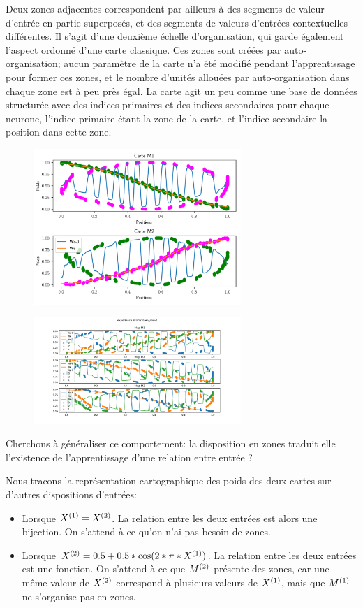 Deux zones adjacentes correspondent par ailleurs à des segments de valeur d'entrée en partie superposés, et des segments de valeurs d'entrées contextuelles différentes. Il s'agit d'une deuxième échelle d'organisation, qui garde également l'aspect ordonné d'une carte classique. Ces zones sont créées par auto-organisation; aucun paramètre de la carte n'a été modifié pendant l'apprentissage pour former ces zones, et le nombre d'unités allouées par auto-organisation dans chaque zone est à peu près égal. La carte agit un peu comme une base de données structurée avec des indices primaires et des indices secondaires pour chaque neurone, l'indice primaire étant la zone de la carte, et l'indice secondaire la position dans cette zone.

\begin{figure}
	\includegraphics[width=0.7\textwidth]{2som_cercle_w.pdf}
\end{figure}

\begin{figure}
	\includegraphics[width=0.7\textwidth]{3som_cercle_w.pdf}
\end{figure}

Cherchons à généraliser ce comportement: la disposition en zones traduit elle l'existence de l'apprentissage d'une relation entre entrée ?

Nous tracons la représentation cartographique des poids des deux cartes sur d'autres dispositions d'entrées: 
\begin{itemize}
	\item Lorsque $X^{({1})} = X^{({2})}$. La relation entre les deux entrées est alors une bijection. On s'attend à ce qu'on n'ai pas besoin de zones.
	\item Lorsque $X^{({2})} = 0.5+0.5*\cos(2*\pi*X^{({1})})$. La relation entre les deux entrées est une fonction. On s'attend à ce que $M^{({2})}$ présente des zones, car une même valeur de $X^{({2})}$ correspond à plusieurs valeurs de $X^{({1})}$, mais que $M^{({1})}$ ne s'organise pas en zones.
\end{itemize}

